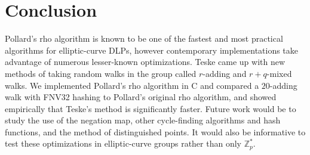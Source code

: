 \documentclass{article}
\newcommand{\ZZ}{\mathbb{Z}}
\newcommand{\NN}{\mathbb{N}}
\newtheorem{defn}[thm]{Definition}
\begin{document}
\iffalse
\begin{defn}
	Let $G$ be a finite cyclic group and $g,h,y \in G$. An \textbf{iterating function} on $G$ is a function $F: G \to G$ such that for any $\alpha,\beta \in \NN_0$ such that $y=g^\alpha h^\beta$ we can efficiently compute $\alpha', \beta' \in \NN_0$ such that $F(y)=g^{\alpha'} h^{\beta'}$.
\end{defn}


\begin{defn}
	Let $G$ be a finite cyclic group, $n \in \NN$, and $M_0, M_1, \ldots, M_{n-1}$ be elements of $G$. Furthermore, let $P$ be a hash function from $G$ to $\ZZ_n$ and $F$ be an iterating function on $G$. A walk $(Y_k)$ with $F$ is called \textbf{$r$-adding} if $F$ is of the form $F(Y) = Y * M_{P(Y)}$ for all $Y \in G$.
\end{defn}
\fi

\section{Conclusion}

Pollard's rho algorithm is known to be one of the fastest and most practical algorithms for elliptic-curve DLPs, however contemporary implementations take advantage of numerous lesser-known optimizations. Teske came up with new methods of taking random walks in the group called $r$-adding and $r+q$-mixed walks. We implemented Pollard's rho algorithm in C and compared a $20$-adding walk with FNV32 hashing to Pollard's original rho algorithm, and showed empirically that Teske's method is significantly faster. Future work would be to study the use of the negation map, other cycle-finding algorithms and hash functions, and the method of distinguished points. It would also be informative to test these optimizations in elliptic-curve groups rather than only $\ZZ_p^*$.

\printbibliography
\end{document}
